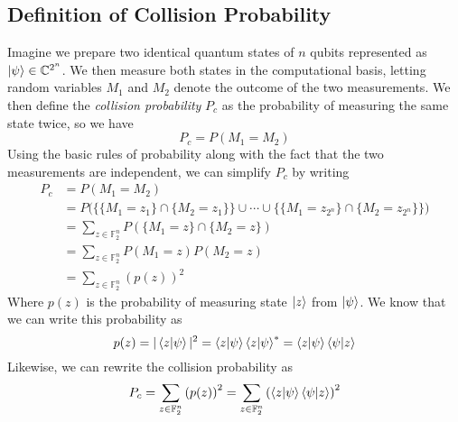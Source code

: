 \message{ !name(report_1.tex)}\documentclass[11pt]{article}
\theoremstyle{definition}
\theoremstyle{plain}
\begin{document}
\subsection{Definition of Collision Probability}
Imagine we prepare two identical quantum states of $n$ qubits represented as $\ket{\psi} \in \mathbb{C}^{2^n}$. We then measure both states in the computational basis, letting random variables $M_1$ and $M_2$ denote the outcome of the two measurements. We then define the \emph{collision probability} $P_c$ as the probability of measuring the same state twice, so we have
\begin{equation}
P_c = P(M_1 = M_2) 
\end{equation}
Using the basic rules of probability along with the fact that the two measurements are independent, we can simplify $P_c$ by writing
\begin{align}
  P_c &= P(M_1 = M_2) \\
      &= P \bigl( \bigl\{ \{M_1 = z_1\} \cap \{M_2 = z_1\} \bigr\} \cup \cdots \cup 
        \bigl\{ \{M_1 = z_{2^n}\} \cap \{M_2 = z_{2^n}\} \bigr\} \bigr) \\
      &= \sum\limits_{z \in \mathbb{F}_2^n} P(\{M_1 = z\} \cap \{M_2 = z\}) \\
      &= \sum\limits_{z \in \mathbb{F}_2^n} P(M_1 = z) P(M_2 = z) \\
      &= \sum\limits_{z \in \mathbb{F}_2^n} {(p(z))}^2        
\end{align}
Where $p(z)$ is the probability of measuring state $\ket{z}$ from $\ket{\psi}$. We know that we can write this probability as
\begin{equation}
  p(z) = |\braket{z | \psi}|^2 = \braket{z | \psi} \braket{z | \psi}^*
  = \braket{z | \psi} \braket{\psi | z} 
\end{equation}
Likewise, we can rewrite the collision probability as 
\begin{equation}\label{collision_probability}
  P_c = \sum\limits_{z \in \mathbb{F}_2^n} {(p(z))}^2
  = \sum\limits_{z \in \mathbb{F}_2^n} {\left( \braket{z | \psi} \braket{\psi | z} \right)}^2
\end{equation}
\end{document}
